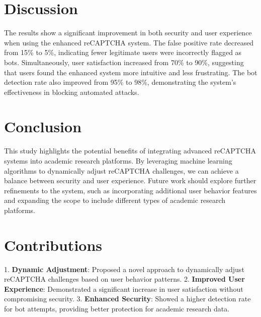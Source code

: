\documentclass{article}
\begin{document}
\section{Discussion}
The results show a significant improvement in both security and user experience when using the enhanced reCAPTCHA system. The false positive rate decreased from 15\% to 5\%, indicating fewer legitimate users were incorrectly flagged as bots. Simultaneously, user satisfaction increased from 70\% to 90\%, suggesting that users found the enhanced system more intuitive and less frustrating. The bot detection rate also improved from 95\% to 98\%, demonstrating the system's effectiveness in blocking automated attacks.

\section{Conclusion}
This study highlights the potential benefits of integrating advanced reCAPTCHA systems into academic research platforms. By leveraging machine learning algorithms to dynamically adjust reCAPTCHA challenges, we can achieve a balance between security and user experience. Future work should explore further refinements to the system, such as incorporating additional user behavior features and expanding the scope to include different types of academic research platforms.

\section{Contributions}
1. \textbf{Dynamic Adjustment}: Proposed a novel approach to dynamically adjust reCAPTCHA challenges based on user behavior patterns.
2. \textbf{Improved User Experience}: Demonstrated a significant increase in user satisfaction without compromising security.
3. \textbf{Enhanced Security}: Showed a higher detection rate for bot attempts, providing better protection for academic research data.



\end{document}
